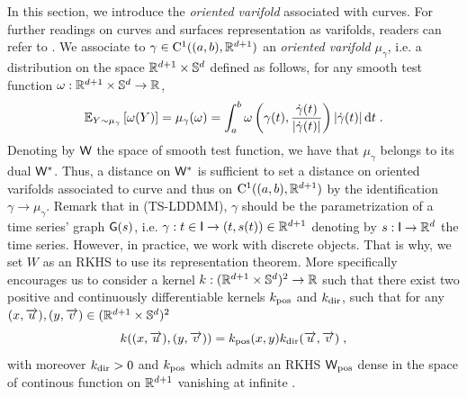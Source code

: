 \label{appendix:varifold}
In this section, we introduce the \textit{oriented varifold} associated with curves.
For further readings on curves and surfaces representation as varifolds, readers can refer to \cite{kaltenmark2017general,charon2013varifold}. 
We associate to $\gamma\in \mathrm{C}^1((a,b),\mathbb{R}^{d+1})$ an \textit{oriented varifold} $\mu_\gamma$, i.e. a distribution on the space $\mathbb{R}^{d+1}\times \mathbb{S}^{d}$ defined as follows, for any smooth test function $\omega :\mathbb{R}^{d+1}\times \mathbb{S}^{d}\to \mathbb{R}  $,
\begin{equation}
  \mathbb{E}_{Y\sim \mu_\gamma}\left[\omega(Y)\right]=\mu_\gamma(\omega)=\int_a^b \omega\left(\gamma(t),\frac{\dot{\gamma}(t)}{|\dot{\gamma}(t)|}\right)|\dot{\gamma}(t)|\mathop{}\!\mathrm{d} t \; .
\end{equation}
Denoting by $\mathsf{W}$ the space of smooth test function, we have that $\mu_\gamma $ belongs to its dual $\mathsf{W}^*$.
 Thus, a distance on $\mathsf{W}^*$ is sufficient to set a distance on oriented varifolds associated to curve and thus on $\mathrm{C}^1((a,b),\mathbb{R}^{d+1})$ by the identification $\gamma\to \mu_\gamma $.
Remark that in (TS-LDDMM), $\gamma$ should be the parametrization of a time series' graph $\mathsf{G}(s)$, i.e. $\gamma: t\in \mathsf{I} \to (t,s(t))\in\mathbb{R}^{d+1} $ denoting by $s:\mathsf{I} \to \mathbb{R}^d$ the time series.
However, in practice, we work with discrete objects.
 That is why, we set $W$ as an RKHS to use its representation theorem.
 More specifically \citep[Proposition 2 \& 4]{kaltenmark2017general} encourages us to consider a kernel $k:(\mathbb{R}^{d+1} \times \mathbb{S}^d)^2\to \mathbb{R}$ such that there exist two positive and continuously differentiable kernels $k_{\mathrm{pos}}$ and $k_{\mathrm{dir}}$, 
 such that for any $(x,\overrightarrow{u}),(y,\overrightarrow{v}) \in (\mathbb{R}^{d+1} \times \mathbb{S}^d)^2$
 \begin{equation}
     k((x,\overrightarrow{u}),(y,\overrightarrow{v})) = k_{\mathrm{pos}}(x,y)k_{\mathrm{dir}}(\overrightarrow{u},\overrightarrow{v}) \;,
   \end{equation}
 with moreover $k_{\mathrm{dir}}>0$ and $ k_{\mathrm{pos}}$ which admits an RKHS $\mathsf{W}_{\mathrm{pos}}$ dense in the space of continous function on $\mathbb{R}^{d+1}$ vanishing at infinite \cite{carmeli2010vector}.

